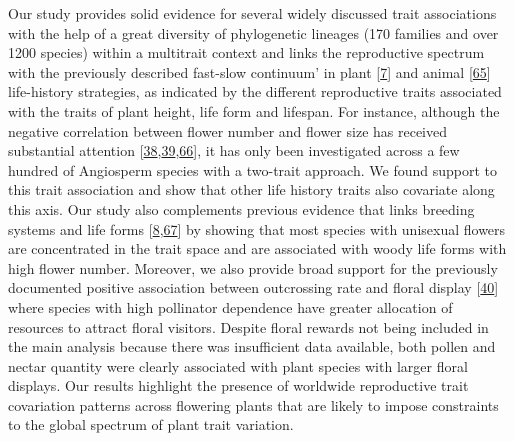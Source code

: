\documentclass[
  12pt,
  a4paper,
]{article}
\begin{document}
Our study provides solid evidence for several widely discussed trait associations with the help of a great diversity of phylogenetic lineages (170 families and over 1200 species) within a multitrait context and links the reproductive spectrum with the previously described fast-slow continuum' in plant {[}\protect\hyperlink{ref-salguero2016}{7}{]} and animal {[}\protect\hyperlink{ref-healy2019}{65}{]} life-history strategies, as indicated by the different reproductive traits associated with the traits of plant height, life form and lifespan. For instance, although the negative correlation between flower number and flower size has received substantial attention {[}\protect\hyperlink{ref-sargent2007}{38},\protect\hyperlink{ref-kettle2011}{39},\protect\hyperlink{ref-worley2000}{66}{]}, it has only been investigated across a few hundred of Angiosperm species with a two-trait approach. We found support to this trait association and show that other life history traits also covariate along this axis. Our study also complements previous evidence that links breeding systems and life forms {[}\protect\hyperlink{ref-friedman2020}{8},\protect\hyperlink{ref-petit2006}{67}{]} by showing that most species with unisexual flowers are concentrated in the trait space and are associated with woody life forms with high flower number. Moreover, we also provide broad support for the previously documented positive association between outcrossing rate and floral display {[}\protect\hyperlink{ref-goodwillie2010}{40}{]} where species with high pollinator dependence have greater allocation of resources to attract floral visitors. Despite floral rewards not being included in the main analysis because there was insufficient data available, both pollen and nectar quantity were clearly associated with plant species with larger floral displays. Our results highlight the presence of worldwide reproductive trait covariation patterns across flowering plants that are likely to impose constraints to the global spectrum of plant trait variation.
\end{document}
